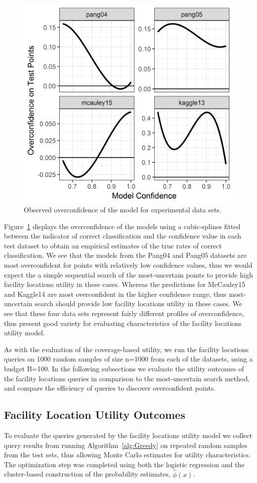 \documentclass[letterpaper]{article} %
\begin{document}
\begin{figure}[hbtp]
  \includegraphics[width=.45\textwidth]{../experimentsAndPlots/overconfidence.png}
  \caption{Observed overconfidence of the model for experimental data sets.}
  \label{fig:overconf}
\end{figure}

Figure~\ref{fig:overconf} displays the overconfidence of the models using a cubic-splines fitted between the indicator of correct classification and the confidence value in each test dataset to obtain an empirical estimates of the true rates of correct classification. We see that the models from the Pang04 and Pang05 datasets are most overconfident for points with relatively low confidence values, thus we would expect the a simple sequential search of the most-uncertain points to provide high facility locations utility in these cases. Whereas the predictions for McCauley15 and Kaggle14 are most overconfident in the higher confidence range, thus most-uncertain search should provide low facility locations utility in these cases. We see that these four data sets represent fairly different profiles of overconfidence, thus present good variety for evaluating characteristics of the facility locations utility model. 

As with the evaluation of the coverage-based utility, we run the facility locations queries on 1000 random samples of size n=1000 from each of the datasets, using a budget B=100. In the following subsections we evaluate the utility outcomes of the facility locations queries in comparison to the most-uncertain search method, and compare the efficiency of queries to discover overconfident points.

\subsection{Facility Location Utility Outcomes}

To evaluate the queries generated by the facility locations utility model we collect query results from running Algorithm~\ref{alg:Greedy} on repeated random samples from the test sets, thus allowing Monte Carlo estimates for utility characteristics. The optimization step was completed using both the logistic regression and the cluster-based construction of the probability estimates, $\hat{\phi}(x)$. 
\end{document}
